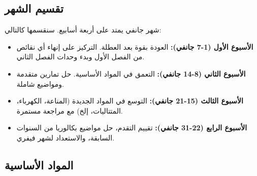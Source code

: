 \documentclass[12pt,a4paper]{book}
\begin{document}
	\subsection{تقسيم الشهر}
	شهر جانفي يمتد على أربعة أسابيع. سنقسمها كالتالي:
	\begin{itemize}
		\item \textbf{الأسبوع الأول (1-7 جانفي):} العودة بقوة بعد العطلة. التركيز على إنهاء أي نقائص من الفصل الأول وبدء وحدات الفصل الثاني.
		\item \textbf{الأسبوع الثاني (8-14 جانفي):} التعمق في المواد الأساسية. حل تمارين متقدمة ومواضيع شاملة.
		\item \textbf{الأسبوع الثالث (15-21 جانفي):} التوسع في المواد الجديدة (المناعة، الكهرباء، المتتاليات، إلخ) مع مراجعة مستمرة.
		\item \textbf{الأسبوع الرابع (22-31 جانفي):} تقييم التقدم، حل مواضيع بكالوريا من السنوات السابقة، والاستعداد لشهر فيفري.
	\end{itemize}
	
	\subsection{المواد الأساسية}
	
\end{document}
